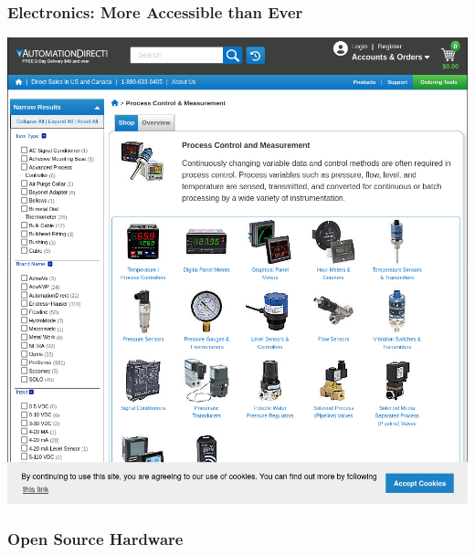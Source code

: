 \documentclass{presentation}
\begin{document}
\begin{frame}\frametitle{Electronics: More Accessible than Ever}
  \includegraphics[width=\textwidth]{"./automation-direct.png"}
\end{frame}

\begin{frame}\frametitle{Open Source Hardware}
\end{frame}
\end{document}
